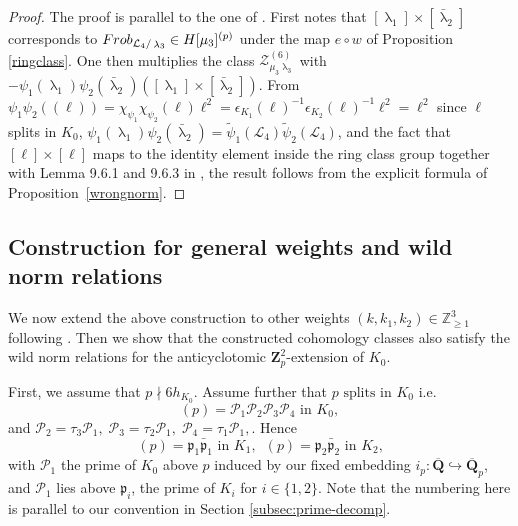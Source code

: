 \documentclass[10pt,letterpaper]{amsart}
\theoremstyle{plain}
\theoremstyle{definition}
\theoremstyle{definition}
\theoremstyle{plain}
\theoremstyle{plain}
\theoremstyle{plain}
\theoremstyle{remark}
\numberwithin{equation}{section}
\newcommand{\pp}{\mathfrak{p}}
\newcommand{\ppbar}{\bar{\mathfrak{p}}}
\DeclareMathOperator{\la}{\lambda}
\def\cL{{\mathcal L}}
\def\cP{{\mathcal P}}
\newcommand{\Q}{\mathbf{Q}}
\newcommand{\Z}{\mathbf{Z}}
\begin{document}
\begin{proof} The proof is parallel to the one of \cite[Thm.\,2.2.7]{CD}.
First notes that $[\la_1]\times[\bar{\la}_2]$ corresponds to ${\rm Frob}_{\cL_4/\la_3}\in H[\mu_3]^{(p)}$ under the map $e\circ w$ of Proposition \ref{ringclass}. One then multiplies the class $\mathcal{Z}_{\mu_3\la_3}^{(6)}$ with
 $-\psi_1(\la_1)\psi_2(\bar{\la}_2)([\la_1]\times [\bar{\la}_2])$. From $\psi_1\psi_2((\ell))=\chi_{\psi_1}\chi_{\psi_2}(\ell)\ell^2=\epsilon_{K_1}(\ell)^{-1}\epsilon_{K_2}(\ell)^{-1}\ell^2=\ell^2$ since $\ell$ splits in $K_0$, $\psi_1(\la_1)\psi_2(\bar{\la}_2)=\tilde{\psi}_1(\cL_4)\tilde{\psi}_2(\cL_4)$, and the fact that $[\ell]\times[\ell]$ maps to the identity element inside the ring class group together with Lemma 9.6.1 and 9.6.3 in \cite{Rubin-ES}, the result follows from the explicit formula of Proposition~\ref{wrongnorm}.
\end{proof}




\subsection{Construction for general weights and wild norm relations}\label{wildnormsetup}

We now extend the above construction to other weights $(k,k_1,k_2)\in\mathbb{Z}_{ \ge 1}^3$ following \cite[Sec.\,2.3]{CD}. Then we show that the constructed cohomology classes also satisfy the wild norm relations for the anticyclotomic $\Z_p^2$-extension of $K_0$. 

First, we assume that $p\nmid 6h_{K_0}$. Assume further that $p \text{ splits in } K_0$ i.e.
\begin{equation*}
    (p)=\cP_1\cP_2\cP_3\cP_4 \text{ in } K_0,
\end{equation*}
and $\cP_2=\tau_3\cP_1,\;\cP_3=\tau_2\cP_1,\;\cP_4=\tau_1\cP_1,$. Hence
\begin{equation*}
\textrm{$(p)=\pp_1\ppbar_1$  in $K_1$,} \textrm{ $(p)=\pp_2\ppbar_2$ in $K_2$,} 
\end{equation*}
with $\cP_1$ the prime of $K_0$ above $p$ induced by our fixed embedding $i_p:\overline{\Q}\hookrightarrow\overline{\Q}_p$, and $\cP_1$ lies above $\pp_i$, the prime of $K_i$ for $i\in\{1,2\}$. Note that the numbering here is parallel to our convention in Section \ref{subsec:prime-decomp}.
\end{document}
